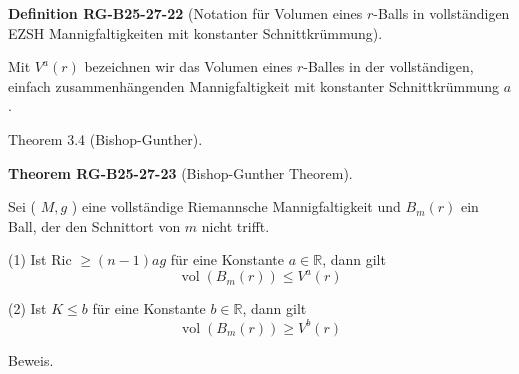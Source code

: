 \documentclass[10pt, letterpaper]{article}
\newcommand{\CustomHeading}[3]{%
  \par\medskip\noindent%
  \textbf{#1 #2} \textnormal{(#3)}.\enskip%
}
\newenvironment{DEF}[2]{\begin{unitbox}\CustomHeading{Definition}{#1}{#2}}{\end{unitbox}}
\newenvironment{THEO}[2]{\begin{unitbox}\CustomHeading{Theorem}{#1}{#2}}{\end{unitbox}}
\begin{document}
\begin{DEF}{RG-B25-27-22}{Notation für Volumen eines $r$-Balls in vollständigen EZSH Mannigfaltigkeiten mit konstanter Schnittkrümmung}
Mit $V^{a}(r)$ bezeichnen wir das Volumen eines $r$-Balles in der vollständigen, einfach zusammenhängenden Mannigfaltigkeit mit konstanter Schnittkrümmung $a$.
\end{DEF}




Theorem 3.4 (Bishop-Gunther). 


\begin{THEO}{RG-B25-27-23}{Bishop-Gunther Theorem}
Sei ( $M, g$ ) eine vollständige Riemannsche Mannigfaltigkeit und $B_{m}(r)$ ein Ball, der den Schnittort von $m$ nicht trifft.

(1) Ist Ric $\geq(n-1)ag$ für eine Konstante $a \in \mathbb{R}$, dann gilt
$$
\operatorname{vol}\left(B_{m}(r)\right) \leq V^{a}(r)
$$

(2) Ist $K \leq b$ für eine Konstante $b \in \mathbb{R}$, dann gilt
$$
\operatorname{vol}\left(B_{m}(r)\right) \geq V^{b}(r)
$$
\end{THEO}



Beweis. 
\end{document}
